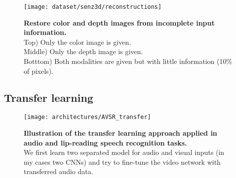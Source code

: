 \begin{figure}[H]
  \centering
  \texttt{[image: dataset/senz3d/reconstructions]}\\[-1em]
  \caption{%
    \textbf{Restore color and depth images from incomplete input
      information.}\\[0.1em]
    Top) Only the color image is given.\\[0.1em]
    Middle) Only the depth image is given.\\[0.1em]
    Botttom) Both modalities are given but with little information
      (10\% of pixels).}
  \label{fig:color_depth_restoration}
\end{figure}

\subsection{Transfer learning}

\begin{figure}[H]
  \centering
  \texttt{[image: architectures/AVSR\_transfer]}\\[-1em]
  \caption{%
    \textbf{Illustration of the transfer learning approach applied in
      audio and lip-reading speech recognition tasks.}\\[0.1em]
    We first learn two separated model for audio and visual inputs
      (in my cases two CNNs) and try to fine-tune the video network
      with transferred audio data.
    }
  \label{fig:AVSR_transfer}
\end{figure}

\newpage

